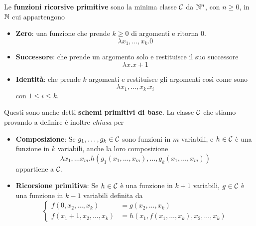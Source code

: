 \begin{definition}
	Le \textbf{funzioni ricorsive primitive} sono la minima
	classe $\mathcal{C}$ da $\mathbb{N}^n$, con $n \geq 0$, in $\mathbb{N}$ cui
	appartengono
	\begin{itemize}
		\item \textbf{Zero}: una funzione che prende $k \geq 0$
		      di argomenti e ritorna 0.
		      \[ \lambda x_1, \dots, x_k . 0 \]
		\item \textbf{Successore}: che prende un argomento solo
		      e restituisce il suo successore
		      \[ \lambda x . x + 1 \]
		\item \textbf{Identità}: che prende $k$ argomenti e
		      restituisce gli argomenti così come sono
		      \[ \lambda x_1, \dots, x_k . x_i \]
		      con $1 \leq i \leq k$.
	\end{itemize}
	Questi sono anche detti \textbf{schemi primitivi di base}.
	La classe $\mathcal{C}$ che stiamo provando a definire è inoltre
	\emph{chiusa} per
	\begin{itemize}
		\item \textbf{Composizione}: Se $g_1, \dots, g_k \in \mathcal{C}$
		      sono funzioni in $m$ variabili, e $h \in \mathcal{C}$ è
		      una funzione in $k$ variabili, anche la loro
		      composizione
		      \[
			      \lambda x_1, \dots x_m .
			      h(g_1(x_1, \dots, x_m), \dots,
			      g_k(x_1, \dots, x_m)
			      )
		      \]
		      appartiene a $\mathcal{C}$.
		\item \textbf{Ricorsione primitiva}: Se $h \in \mathcal{C}$
		      è una funzione in $k+1$ variabili, $g \in \mathcal{C}$
		      è una funzione in $k-1$ variabili definita da
		      \[
			      \begin{cases}
				      f(0, x_2, \dots, x_k)       & =
				      g(x_2, \dots, x_k)              \\
				      f(x_1 + 1, x_2, \dots, x_k) & =
				      h(x_1, f(x_1, \dots, x_k),
				      x_2, \dots, x_k)
			      \end{cases}
		      \]
	\end{itemize}
\end{definition}


